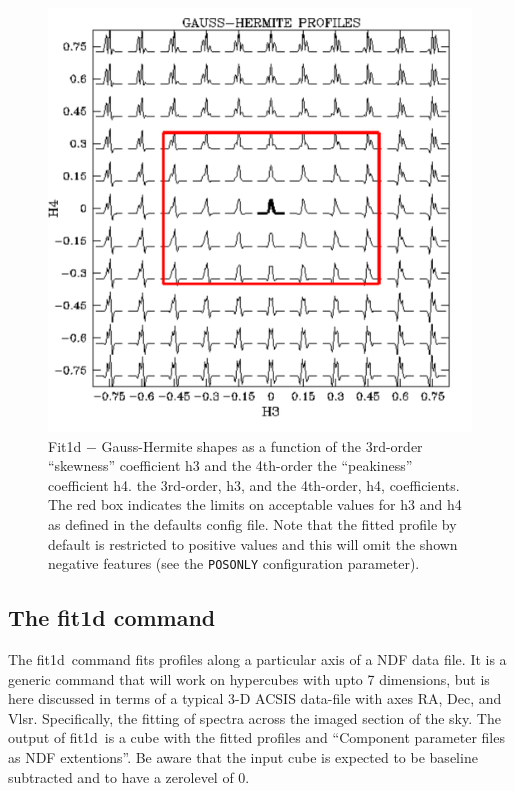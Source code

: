 \documentclass[twoside,11pt]{article}
\newcommand{\xref}[3]{#1}
\renewcommand{\_}{\texttt{\symbol{95}}}
\newcommand{\task}[1]{\textsf{#1}}
\newcommand{\fitdd}{\xref{\task{fit1d}}{sun258}{FIT1D}}
\newcommand{\cparam}[1]{\texttt{#1}}     %
\begin{document}
\begin{figure}[htb]
  \begin{center}
    \includegraphics[width=0.8\linewidth]{sun258_gaussherm}
    \caption{Fit1d $-$ Gauss-Hermite shapes as a function of the 3rd-order
      ``skewness'' coefficient h3 and the 4th-order the ``peakiness''
      coefficient h4.  the 3rd-order, h3, and the 4th-order, h4,
      coefficients. The red box indicates the limits on acceptable
      values for h3 and h4 as defined in the defaults config file. Note
      that the fitted profile by default is restricted to positive values
      and this will omit the shown negative features (see
      the \cparam{POS\_ONLY} configuration parameter).}
    \label{fig:gaussherm}
  \end{center}
\end{figure}

\subsection{The fit1d command}

The \fitdd\ command fits profiles along a particular axis of a NDF
data file.  It is a generic command that will work on hypercubes with
upto 7 dimensions, but is here discussed in terms of a typical 3-D
ACSIS data-file with axes RA, Dec, and Vlsr. Specifically, the fitting
of spectra across the imaged section of the sky. The output of \fitdd\
is a cube with the fitted profiles and ``Component parameter files as
NDF extentions''. Be aware that the input cube is expected to be
baseline subtracted and to have a zerolevel of 0.
\end{document}
